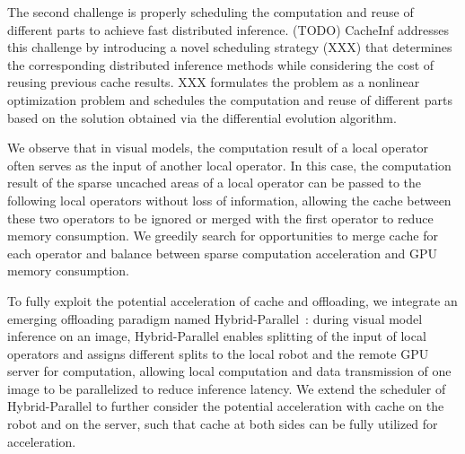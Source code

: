 The second challenge is properly scheduling the computation and reuse of different parts to achieve fast distributed inference. 
(TODO) CacheInf addresses this challenge by introducing a novel scheduling strategy (XXX) that determines the corresponding distributed inference methods while considering the cost of reusing previous cache results. 
XXX formulates the problem as a nonlinear optimization problem and schedules the computation and reuse of different parts based on the solution obtained via the differential evolution algorithm.



We observe that in visual models, the computation result of a local operator often serves as the input of another local operator. 
In this case, the computation result of the sparse uncached areas of a local operator can be passed to the following local operators without loss of information, allowing the cache between these two operators to be ignored or merged with the first operator to reduce memory consumption.
We greedily search for opportunities to merge cache for each operator and balance between sparse computation acceleration and GPU memory consumption.

To fully exploit the potential acceleration of cache and offloading, we integrate an emerging offloading paradigm named Hybrid-Parallel~\cite{sun2024hybridparallel}: during visual model inference on an image, Hybrid-Parallel enables splitting of the input of local operators and assigns different splits to the local robot and the remote GPU server for computation, allowing local computation and data transmission of one image to be parallelized to reduce inference latency.
We extend the scheduler of Hybrid-Parallel to further consider the potential acceleration with cache on the robot and on the server, such that cache at both sides can be fully utilized for acceleration.


